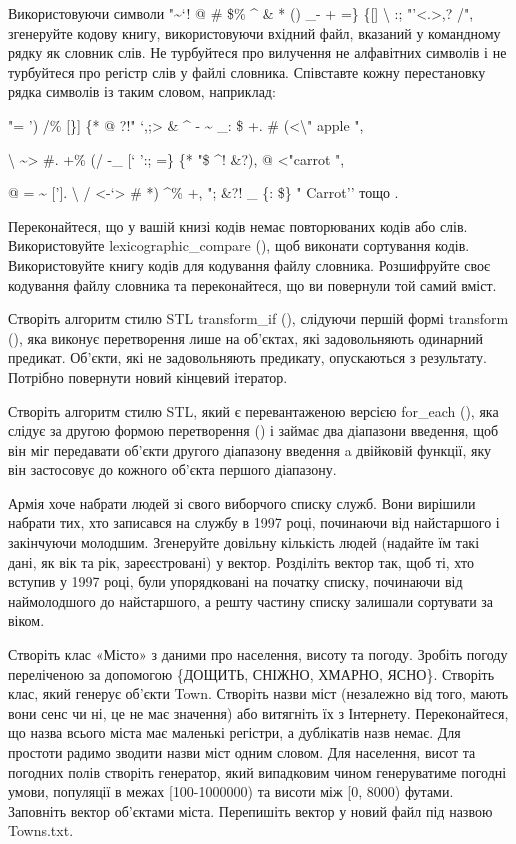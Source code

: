 \documentclass[]{article}
\begin{document}
\begin{enumerate}
\protect\hypertarget{_Hlk65952617}{}{}Використовуючи символи
"\textasciitilde{}`! @ \# \$\% \^{} \& * () \_- + =\} \{{[}{]}
\textbar{} \textbackslash{} :; "'\textless{}.\textgreater{},? /",
згенеруйте кодову книгу, використовуючи вхідний файл, вказаний у
командному рядку як словник слів. Не турбуйтеся про вилучення не
алфавітних символів і не турбуйтеся про регістр слів у файлі словника.
Співставте кожну перестановку рядка символів із таким словом, наприклад:

"= ') /\% {[}\}{]} \textbar{} \{* @ ?!" `,;\textgreater{} \& \^{} -
\textasciitilde{} \_: \$ +. \# (\textless{}\textbackslash{}" apple ",

\textbar{}{]} \textbackslash{} \textasciitilde{}\textgreater{} \#. +\%
(/ -\_ {[}` ':; =\} \{* "\$ \^{}! \&?), @ \textless{}"carrot ",

@ = \textasciitilde{} {[}'{]}. \textbackslash{} /
\textless{}-`\textgreater{} \# *) \^{}\% +, "; \&?! \_ \{: \textbar{}
\$\} " Carrot'' тощо .

Переконайтеся, що у вашій книзі кодів немає повторюваних кодів або слів.
Використовуйте lexicographic\_compare (), щоб виконати сортування кодів.
Використовуйте книгу кодів для кодування файлу словника. Розшифруйте
своє кодування файлу словника та переконайтеся, що ви повернули той
самий вміст.

Створіть алгоритм стилю STL transform\_if (), слідуючи першій формі
transform (), яка виконує перетворення лише на об'єктах, які
задовольняють одинарний предикат. Об'єкти, які не задовольняють
предикату, опускаються з результату. Потрібно повернути новий кінцевий
ітератор.

Створіть алгоритм стилю STL, який є перевантаженою версією for\_each (),
яка слідує за другою формою перетворення () і займає два діапазони
введення, щоб він міг передавати об'єкти другого діапазону введення a
двійковій функції, яку він застосовує до кожного об'єкта першого
діапазону.

\protect\hypertarget{_Hlk65952131}{}{}Армія хоче набрати людей зі свого
виборчого списку служб. Вони вирішили набрати тих, хто записався на
службу в 1997 році, починаючи від найстаршого і закінчуючи молодшим.
Згенеруйте довільну кількість людей (надайте їм такі дані, як вік та
рік, зареєстровані) у вектор. Розділіть вектор так, щоб ті, хто вступив
у 1997 році, були упорядковані на початку списку, починаючи від
наймолодшого до найстаршого, а решту частину списку залишали сортувати
за віком.

Створіть клас «Місто» з даними про населення, висоту та погоду. Зробіть
погоду переліченою за допомогою \{ДОЩИТЬ, СНІЖНО, ХМАРНО, ЯСНО\}.
Створіть клас, який генерує об'єкти Town. Створіть назви міст (незалежно
від того, мають вони сенс чи ні, це не має значення) або витягніть їх з
Інтернету. Переконайтеся, що назва всього міста має маленькі регістри, а
дублікатів назв немає. Для простоти радимо зводити назви міст одним
словом. Для населення, висот та погодних полів створіть генератор, який
випадковим чином генеруватиме погодні умови, популяції в межах
{[}100-1000000) та висоти між {[}0, 8000) футами. Заповніть вектор
об'єктами міста. Перепишіть вектор у новий файл під назвою Towns.txt.


\end{enumerate}
\end{document}
